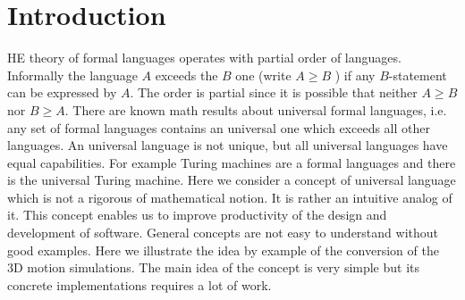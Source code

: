 \documentclass[10pt,journal,compsoc]{IEEEtran}
\begin{document}
	
	\ifCLASSOPTIONcompsoc
	\else
	\section{Introduction}
	\label{sec:introduction2}
	\fi
	
	
	
	
	HE theory of formal languages operates with partial order of languages.  Informally the language $A$ exceeds the  $B$ one (write $A \ge B$ ) if any $B$-statement can be expressed by  $A$.  The order is partial since it is possible that neither $A \ge B$ nor $B\ge A$. There are known math results about universal formal languages, i.e. any set of formal languages contains an universal one which exceeds all other languages. An universal language is not unique, but all universal languages have equal capabilities. For example  Turing machines are a formal languages and there is the universal Turing machine. Here we consider a concept of  universal language which is not a rigorous of mathematical notion. It is rather an intuitive analog of it. This concept enables us to improve productivity of the design and development of software. General concepts are not easy to understand without  good examples. Here we illustrate the idea by example of the conversion of the 3D motion simulations. The main idea of the concept is very simple but its concrete implementations requires a lot of work.
\end{document}

